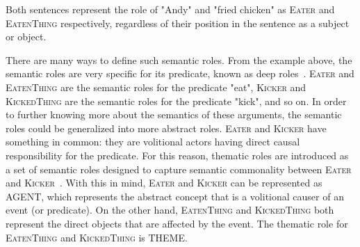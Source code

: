 Both sentences represent the role of "Andy" and "fried chicken" as \textsc{Eater} and \textsc{EatenThing} respectively, regardless of their position in the sentence as a subject or object.

There are many ways to define such semantic roles. From the example above, the semantic roles are very specific for its predicate, known as deep roles~\citep{jurafsky2016speech}. \textsc{Eater} and \textsc{EatenThing} are the semantic roles for the predicate "eat", \textsc{Kicker} and \textsc{KickedThing} are the semantic roles for the predicate "kick", and so on. In order to further knowing more about the semantics of these arguments, the semantic roles could be generalized into more abstract roles. \textsc{Eater} and \textsc{Kicker} have something in common: they are volitional actors having direct causal responsibility for the predicate. For this reason, thematic roles are introduced as a set of semantic roles designed to capture semantic commonality between \textsc{Eater} and \textsc{Kicker}~\citep{jurafsky2016speech}. With this in mind, \textsc{Eater} and \textsc{Kicker} can be represented as AGENT, which represents the abstract concept that is a volitional causer of an event (or predicate). On the other hand, \textsc{EatenThing} and \textsc{KickedThing} both represent the direct objects that are affected by the event. The thematic role for \textsc{EatenThing} and \textsc{KickedThing} is THEME.

